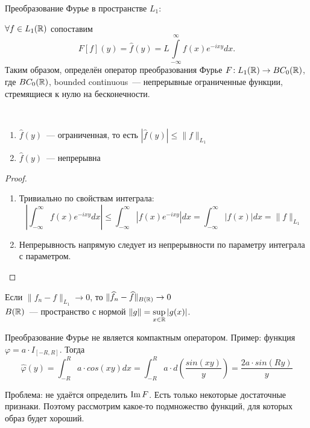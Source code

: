 \begin{definition}
    Преобразование Фурье в пространстве $L_1$:
    
    $\forall f \in L_1(\mathbb{R})$ сопоставим
    \[F[f](y) = \widehat{f}(y) = L \int\limits_{-\infty}^{\infty} f(x) e^{-ixy} dx.\]
    Таким образом, определён оператор преобразования Фурье
    $F\!: L_1(\mathbb{R}) \to BC_0(\mathbb{R})$, где $BC_0(\mathbb{R})$, bounded continuous~--- непрерывные ограниченные функции, стремящиеся к нулю на бесконечности.
\end{definition}

\begin{statement}
\(\)
    \begin{enumerate}
     \item $\widehat{f}(y)$~--- ограниченная, то есть $|\widehat{f}(y)| \leqslant \|f\|_{L_1}$
     \item $\widehat{f}(y)$~--- непрерывна
    \end{enumerate}
\end{statement}
\begin{proof}
     \begin{enumerate}
     \item Тривиально по свойствам интеграла: 
     \[\left|\int_{-\infty}^{\infty} f(x) e^{-ixy} dx\right| \leq 
     \int_{-\infty}^{\infty} |f(x) e^{-ixy}| dx = \int_{-\infty}^{\infty} |f(x)| dx = \|f\|_{L_1}\]
     \item Непрерывность напрямую следует из непрерывности по параметру интеграла с параметром.
    \end{enumerate}
\end{proof}

\begin{statement}
    Если $\|f_n - f\|_{L_1} \to 0$, то $\|\widehat{f}_n - \widehat{f}\|_{B(\mathbb{R})}  \to 0$\\
    $B(\mathbb{R})$~--- пространство с нормой $\|g\| = \sup\limits_{x \in \mathbb{R}} |g(x)|$.
\end{statement}

\begin{unnecessary}
\begin{example}
    Преобразование Фурье не является компактным оператором. Пример: функция $\varphi = a \cdot I_{[-R, R]}$. Тогда 
    \[
    \widehat{\varphi}(y) = 
    \int_{-R}^R a \cdot cos(xy) dx = \int_{-R}^R a \cdot d\left( \frac{sin(xy)}{y} \right) = \frac{2a \cdot sin(Ry)}{y}
    \]
\end{example}

Проблема: не удаётся определить $\operatorname{Im} F$. Есть только некоторые достаточные признаки. Поэтому рассмотрим какое-то подмножество функций, для которых образ будет хороший.

\end{unnecessary}

